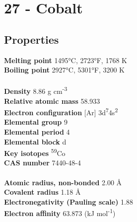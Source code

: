 \section{27 - Cobalt}
\label{sec:elem-cobalt}
\subsection{Properties}
\textbf{Melting point} 1495°C, 2723°F, 1768 K\\
\textbf{Boiling point} 2927°C, 5301°F, 3200 K\\
\\
\textbf{Density} 8.86 g cm\textsuperscript{-3}\\
\textbf{Relative atomic mass} 58.933\\
\textbf{Electron configuration} [Ar] 3d\textsuperscript{7}4s\textsuperscript{2}\\
\textbf{Elemental group} 9\\
\textbf{Elemental period} 4\\
\textbf{Elemental block} d\\
\textbf{Key isotopes} \textsuperscript{59}Co\\
\textbf{CAS number} 7440-48-4\\
\\
\textbf{Atomic radius, non-bonded} 2.00 Å\\
\textbf{Covalent radius} 1.18 Å\\
\textbf{Electronegativity (Pauling scale)} 1.88\\
\textbf{Electron affinity} 63.873 (kJ mol\textsuperscript{-1})\\